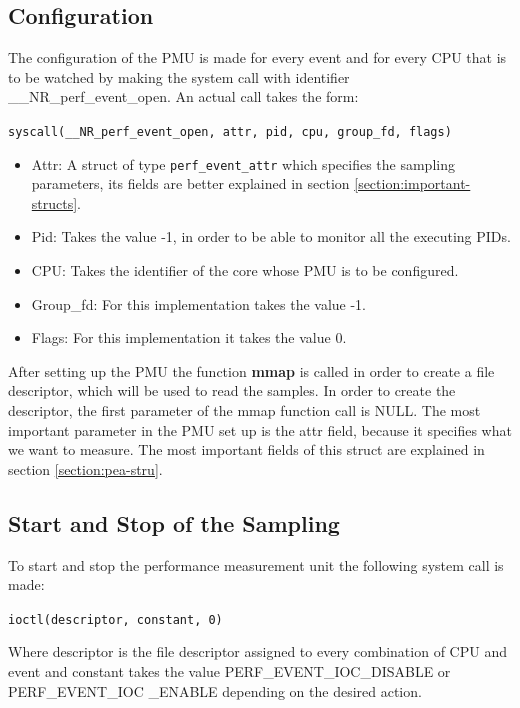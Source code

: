 \subsection{Configuration}\label{section:confgtn}
The configuration of the PMU is made for every event and for every CPU that is to be watched by making the system call with identifier \_\_NR\_perf\_event\_open. An actual call takes the form: 
\\
\begin{center}
\texttt{syscall(\_\_NR\_perf\_event\_open, attr, pid, cpu, group\_fd, flags) }
\end{center}

\begin{itemize}
	\item Attr: A struct of type \texttt{perf\_event\_attr} which specifies the sampling parameters, its fields are better explained in section \ref{section:important-structs}. 
	\item Pid: Takes the value -1, in order to be able to monitor all the executing PIDs.
	\item CPU: Takes the identifier of the core whose PMU is to be configured.
	\item Group\_fd: For this implementation takes the value -1.
	\item Flags: For this implementation it takes the value 0.
\end{itemize}

After setting up the PMU the function \textbf{mmap} is called in order to create a file descriptor, which will be used to read the samples. In order to create the descriptor, the first parameter of the mmap function call is NULL. The most important parameter in the PMU set up is the attr field, because it specifies what we want to measure. The most important fields of this struct are explained in section \ref{section:pea-stru}.  

\subsection{Start and Stop of the Sampling}\label{section:start-sto}

To start and stop the performance measurement unit the following system call is made: 
\\
\begin{center}
\texttt{ioctl(descriptor, constant, 0)}
\end{center}
Where descriptor is the file descriptor assigned to every combination of CPU and event and constant takes the value PERF\_EVENT\_IOC\_DISABLE or PERF\_EVENT\_IOC \_ENABLE depending on the desired action.


